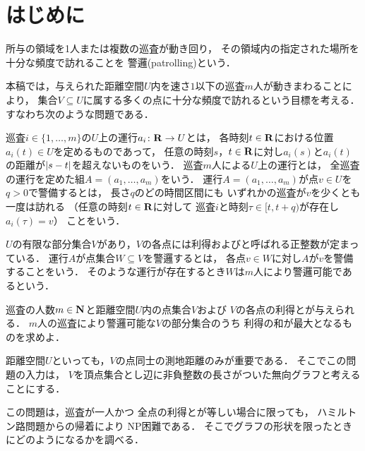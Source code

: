 \section{はじめに}
所与の領域を1人または複数の巡査が動き回り，
その領域内の指定された場所を十分な頻度で訪れることを
警邏(patrolling)という\cite{chen2013fence, coene2011charlemagne, czyzowicz2011boundary}．

本稿では，与えられた距離空間$U$内を速さ$1$以下の巡査$m$人が動きまわることにより，
集合$V \subseteq U$に属する多くの点に十分な頻度で訪れるという目標を考える．
すなわち次のような問題である．

巡査$i \in \{1, \ldots, m\}$の$U$上の運行$a _i \colon \mathbf R \to U$とは，
各時刻$t \in \mathbf R$における位置$a _i (t) \in U$を定めるものであって，
任意の時刻$s$，$t \in \mathbf R$に対し$a _i (s)$と$a _i (t)$の距離が$\lvert{s - t}\rvert$を超えないものをいう．
巡査$m$人による$U$上の運行とは，
全巡査の運行を定めた組$A = (a _1, \dots, a _m)$をいう．
運行$A = (a _1, \dots, a _m)$が点$v \in U$を{\maxIdletime}$q > 0$で警備するとは，
長さ$q$のどの時間区間にも
いずれかの巡査が$v$を少くとも一度は訪れる
（任意の時刻$t \in \mathbf R$に対して
巡査$i$と時刻$\tau \in [t, t + q)$が存在し$a _i (\tau) = v$）
ことをいう．

$U$の有限な部分集合$V$があり，$V$の各点には利得および{\maxIdletime}と呼ばれる正整数が定まっている．
運行$A$が点集合$W \subseteq V$を警邏するとは，
各点$v \in W$に対し$A$が$v$を警備することをいう．
そのような運行が存在するとき$W$は$m$人により警邏可能であるという．

\begin{patrollingProblem}
巡査の人数$m \in \mathbf N$と距離空間$U$内の点集合$V$および
$V$の各点の利得と{\maxIdletime}が与えられる．
$m$人の巡査により警邏可能な$V$の部分集合のうち
利得の和が最大となるものを求めよ．
\end{patrollingProblem}

距離空間$U$といっても，$V$の点同士の測地距離のみが重要である．
そこでこの問題の入力は，
$V$を頂点集合とし辺に非負整数の長さがついた無向グラフと考えることにする．

この問題は，巡査が一人かつ
全点の利得と{\maxIdletime}が等しい場合に限っても，
ハミルトン路問題からの帰着により
NP困難である\cite[Theorem~8]{coene2011charlemagne}．
そこでグラフの形状を限ったときにどのようになるかを調べる．

